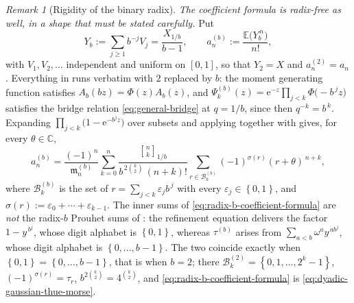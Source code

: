\documentclass[11pt,oneside,openany]{book}
\theoremstyle{definition}
\theoremstyle{remark}
\newtheorem{remark}[remark]{Remark}
\newcommand{\Qbinom}[3]{\genfrac{[}{]}{0pt}{}{#1}{#2}_{#3}}
\newcommand{\C}{\mathbb C}
\newcommand{\e}{\mathrm e}
\newcommand{\set}[1]{\left\{#1\right\}}
\newcommand{\defeq}{\mathrel{:=}}
\begin{document}
\begin{remark}[Rigidity of the binary radix]
\emph{The coefficient formula is radix-free as well, in a shape that must be stated carefully.}  Put
\[
 Y_b\defeq\sum_{j\ge1}b^{-j}V_j=\frac{X_{1/b}}{b-1},
 \qquad
 a^{(b)}_n\defeq\frac{\mathbb E\bigl(Y_b^{\,n}\bigr)}{n!},
\]
with $V_1,V_2,\ldots$ independent and uniform on $[0,1]$, so that $Y_2=X$ and $a^{(2)}_n=a_n$.  Everything in  runs verbatim with $2$ replaced by $b$: the moment generating function satisfies $A_b(bz)=\Phi(z)A_b(z)$, and $\Psi^{(b)}_k(z)=\e^{-z}\prod_{j<k}\Phi\bigl(-b^{\,j}z\bigr)$ satisfies the bridge relation \eqref{eq:general-bridge} at $q=1/b$, since then $q^{-k}=b^{\,k}$.  Expanding $\prod_{j<k}\bigl(1-\e^{-b^{j}z}\bigr)$ over subsets and applying  together with  gives, for every $\theta\in\C$,
\begin{equation}\label{eq:radix-b-coefficient-formula}
 a^{(b)}_n
 =\frac{(-1)^n}{\mathfrak m^{(b)}_n}
  \sum_{k=0}^{n}\frac{\Qbinom nk{1/b}}{b^{\,2\binom k2}\,(n+k)!}
  \sum_{r\in\mathcal B^{(b)}_k}(-1)^{\sigma(r)}(r+\theta)^{\,n+k},
\end{equation}
where $\mathcal B^{(b)}_k$ is the set of $r=\sum_{j<k}\varepsilon_jb^{\,j}$ with every $\varepsilon_j\in\set{0,1}$, and $\sigma(r)\defeq\varepsilon_0+\cdots+\varepsilon_{k-1}$.  The inner sums of \eqref{eq:radix-b-coefficient-formula} are \emph{not} the radix-$b$ Prouhet sums of : the refinement equation delivers the factor $1-y^{\,b^{j}}$, whose digit alphabet is $\set{0,1}$, whereas $\tau^{(b)}$ arises from $\sum_{a<b}\omega^ay^{\,ab^{j}}$, whose digit alphabet is $\set{0,\ldots,b-1}$.  The two coincide exactly when $\set{0,1}=\set{0,\ldots,b-1}$, that is when $b=2$; there $\mathcal B^{(2)}_k=\set{0,1,\ldots,2^k-1}$, $(-1)^{\sigma(r)}=\tau_r$, $b^{2\binom k2}=4^{\binom k2}$, and \eqref{eq:radix-b-coefficient-formula} is \eqref{eq:dyadic-gaussian-thue-morse}.


\end{remark}
\end{document}
